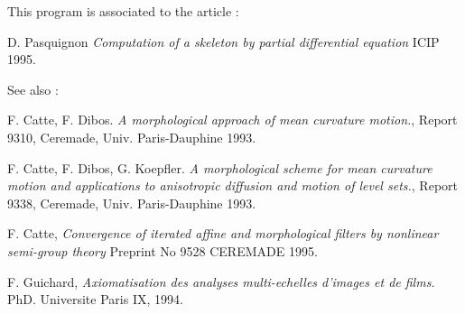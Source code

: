This program is associated to the article :

D. Pasquignon {\em Computation of a skeleton by partial differential
equation}
ICIP 1995.

See also :

F. Catte, F. Dibos. {\em A morphological approach of mean curvature motion.}, Report 9310, Ceremade, Univ. Paris-Dauphine 1993.

F. Catte, F. Dibos, G. Koepfler. {\em A morphological scheme for mean curvature motion and applications to anisotropic diffusion and motion of level sets.}, Report 9338, Ceremade, Univ. Paris-Dauphine 1993.

F. Catte, {\em Convergence of iterated affine and morphological filters by nonlinear semi-group theory} Preprint No 9528 CEREMADE 1995.

F. Guichard, {\em Axiomatisation des analyses multi-echelles d'images et de films.} PhD. Universite Paris IX, 1994.














